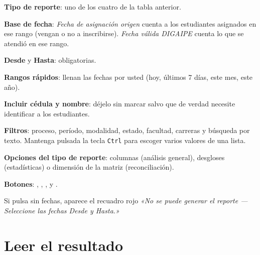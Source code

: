 \begin{leyenda}
  \item[1] \textbf{Tipo de reporte}: uno de los cuatro de la tabla anterior.
  \item[2] \textbf{Base de fecha}: \emph{Fecha de asignación origen} cuenta a los estudiantes
        asignados en ese rango (vengan o no a inscribirse). \emph{Fecha válida DIGAIPE} cuenta
        lo que se atendió en ese rango.
  \item[3] \textbf{Desde} y \textbf{Hasta}: obligatorias.
  \item[4] \textbf{Rangos rápidos}: llenan las fechas por usted (hoy, últimos 7 días, este mes,
        este año).
  \item[5] \textbf{Incluir cédula y nombre}: déjelo sin marcar salvo que de verdad necesite
        identificar a los estudiantes.
  \item[6] \textbf{Filtros}: proceso, período, modalidad, estado, facultad, carreras y búsqueda
        por texto. Mantenga pulsada la tecla \texttt{Ctrl} para escoger varios valores de una
        lista.
  \item[7] \textbf{Opciones del tipo de reporte}: columnas (análisis general), desgloses
        (estadísticas) o dimensión de la matriz (reconciliación).
  \item[8] \textbf{Botones}: , , ,
         y .
\end{leyenda}

\begin{pasos}
\end{pasos}

\begin{importante}
Si pulsa  sin fechas, aparece el recuadro rojo \emph{«No se puede generar el
reporte — Seleccione las fechas Desde y Hasta.»}
\end{importante}

\section{Leer el resultado}

